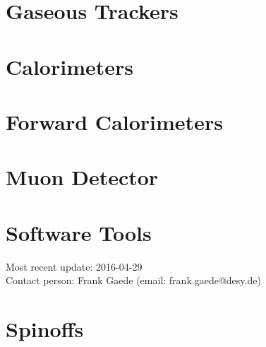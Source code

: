 \documentclass[10pt,final]{report}
\begin{document}
\chapter{Gaseous Trackers}



\chapter{Calorimeters}













\chapter{Forward Calorimeters}



\chapter{Muon Detector}




\chapter{Software Tools}
Most recent update: 2016-04-29\\
Contact person: Frank Gaede (email: frank.gaede@desy.de)







% 
\chapter{Spinoffs}

\printbibliography
\end{document}
